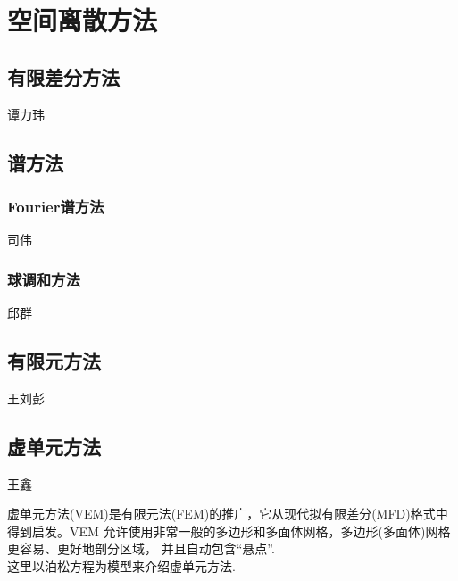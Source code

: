 \section{空间离散方法}

\subsection{有限差分方法}
{\color{red}\begin{center}
    谭力玮
\end{center}}

\subsection{谱方法}

\subsubsection{Fourier谱方法}
{\color{red}\begin{center}
     司伟
\end{center}}

\subsubsection{球调和方法}

{\color{red}\begin{center}
     邱群
\end{center}}


\subsection{有限元方法}

{\color{red}\begin{center}
     王刘彭
\end{center}}


\subsection{虚单元方法}
{\color{red}\begin{center}
    王鑫
\end{center}}

虚单元方法(VEM)是有限元法(FEM)的推广，它从现代拟有限差分(MFD)格式中得到启发。VEM
允许使用非常一般的多边形和多面体网格，多边形(多面体)网格更容易、更好地剖分区域，
并且自动包含“悬点”.\\

这里以泊松方程为模型来介绍虚单元方法.\\

